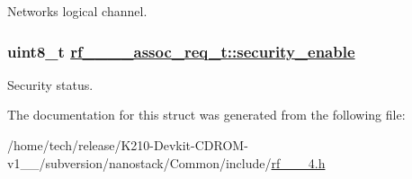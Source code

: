 Networks logical channel. \hypertarget{structrf__802__15__4__assoc__req__t_271943aeb65f1e9b6f872e209c631416}{
\subsubsection[security\_\-enable]{\setlength{\rightskip}{0pt plus 5cm}uint8\_\-t \hyperlink{structrf__802__15__4__assoc__req__t_271943aeb65f1e9b6f872e209c631416}{rf\_\_\_\_\-assoc\_\-req\_\-t::security\_\-enable}}}
\label{structrf__802__15__4__assoc__req__t_271943aeb65f1e9b6f872e209c631416}


Security status. 

The documentation for this struct was generated from the following file:\begin{CompactItemize}
\item 
/home/tech/release/K210-Devkit-CDROM-v1\_\_/subversion/nanostack/Common/include/\hyperlink{rf__802__15__4_8h}{rf\_\_\_\-4.h}\end{CompactItemize}
